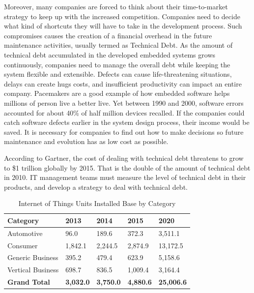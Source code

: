 Moreover, many companies are forced to think about their time-to-market strategy to keep up with the increased competition. Companies need to decide what kind of shortcuts they will have to take in the development process. Such compromises causes the creation of a financial overhead in the future maintenance activities, usually termed as Technical Debt\cite{p29-cunningham}. As the amount of technical debt accumulated in the developed embedded systems grows continuously, companies need to manage the overall debt while keeping the system flexible and extensible. Defects can cause life-threatening situations, delays can create hugs costs, and insufficient productivity can impact an entire company\cite{ebert2009embedded}. Pacemakers are a good example of how embedded software helps millions of person live a better live. Yet between 1990 and 2000, software errors accounted for about 40\% of half million devices recalled\cite{ebert2009embedded}. If the companies could catch software defects earlier in the system design process, their income would be saved. It is necessary for companies to find out how to make decisions so future maintenance and evolution has as low cost as possible. 

According to Gartner\cite{gartner2010}, the cost of dealing with technical debt threatens to grow to \$1 trillion globally by 2015. That is the double of the amount of technical debt in 2010. IT management teams must measure the level of technical debt in their products, and develop a strategy to deal with technical debt.



\begin{table}[H]
	\centering
	\begin{tabular}{ | l | l | l | l | l |}
	\hline
	\textbf{Category} & \textbf{2013} & \textbf{2014} & \textbf{2015} & \textbf{2020} \\ \hline
	Automotive & 96.0 & 189.6 & 372.3 & 3,511.1 \\ \hline
	Consumer & 1,842.1 & 2,244.5 & 2,874.9 & 13,172.5 \\ \hline
	Generic Business & 395.2 & 479.4 & 623.9 & 5,158.6 \\ \hline
	Vertical Business & 698.7 & 836.5 & 1,009.4 & 3,164.4 \\ \hline
	\textbf{Grand Total} & \textbf{3,032.0} & \textbf{3,750.0} & \textbf{4,880.6} & \textbf{25,006.6} \\
	\hline
	\end{tabular}
	\caption{Internet of Things Units Installed Base by Category\cite{gartner}} \label{tab:table1}
\end{table}


